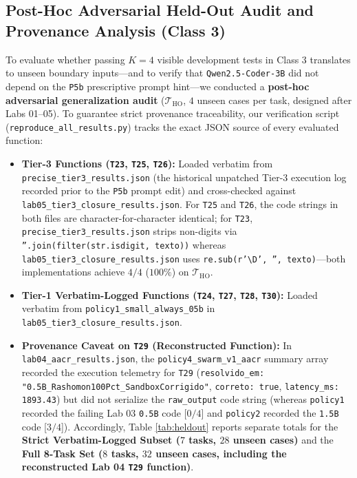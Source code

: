 \documentclass[10pt,a4paper]{article}
\begin{document}
\subsection{Post-Hoc Adversarial Held-Out Audit and Provenance Analysis (Class 3)}
\label{sec:heldout}

To evaluate whether passing $K=4$ visible development tests in Class 3 translates to unseen boundary inputs—and to verify that \texttt{Qwen2.5-Coder-3B} did not depend on the \texttt{P5b} prescriptive prompt hint—we conducted a \textbf{post-hoc adversarial generalization audit} ($\mathcal{T}_{\text{HO}}$, $4$ unseen cases per task, designed after Labs 01--05). To guarantee strict provenance traceability, our verification script (\texttt{reproduce\_all\_results.py}) tracks the exact JSON source of every evaluated function:
\begin{itemize}
    \item \textbf{Tier-3 Functions (\texttt{T23}, \texttt{T25}, \texttt{T26}):} Loaded verbatim from \texttt{precise\_tier3\_results.json} (the historical unpatched Tier-3 execution log recorded prior to the \texttt{P5b} prompt edit) and cross-checked against \texttt{lab05\_tier3\_closure\_results.json}. For \texttt{T25} and \texttt{T26}, the code strings in both files are character-for-character identical; for \texttt{T23}, \texttt{precise\_tier3\_results.json} strips non-digits via \texttt{''.join(filter(str.isdigit, texto))} whereas \texttt{lab05\_tier3\_closure\_results.json} uses \texttt{re.sub(r'\textbackslash D', '', texto)}—both implementations achieve $4/4$ ($100\%$) on $\mathcal{T}_{\text{HO}}$.
    \item \textbf{Tier-1 Verbatim-Logged Functions (\texttt{T24}, \texttt{T27}, \texttt{T28}, \texttt{T30}):} Loaded verbatim from \texttt{policy1\_small\_always\_05b} in \texttt{lab05\_tier3\_closure\_results.json}.
    \item \textbf{Provenance Caveat on \texttt{T29} (Reconstructed Function):} In \texttt{lab04\_aacr\_results.json}, the \texttt{policy4\_swarm\_v1\_aacr} summary array recorded the execution telemetry for \texttt{T29} (\texttt{resolvido\_em: "0.5B\_Rashomon100Pct\_SandboxCorrigido"}, \texttt{correto: true}, \texttt{latency\_ms: 1893.43}) but did not serialize the \texttt{raw\_output} code string (whereas \texttt{policy1} recorded the failing Lab 03 \texttt{0.5B} code [$0/4$] and \texttt{policy2} recorded the \texttt{1.5B} code [$3/4$]). Accordingly, Table \ref{tab:heldout} reports separate totals for the \textbf{Strict Verbatim-Logged Subset ($7$ tasks, $28$ unseen cases)} and the \textbf{Full 8-Task Set ($8$ tasks, $32$ unseen cases, including the reconstructed Lab 04 \texttt{T29} function)}.
\end{itemize}
\end{document}
